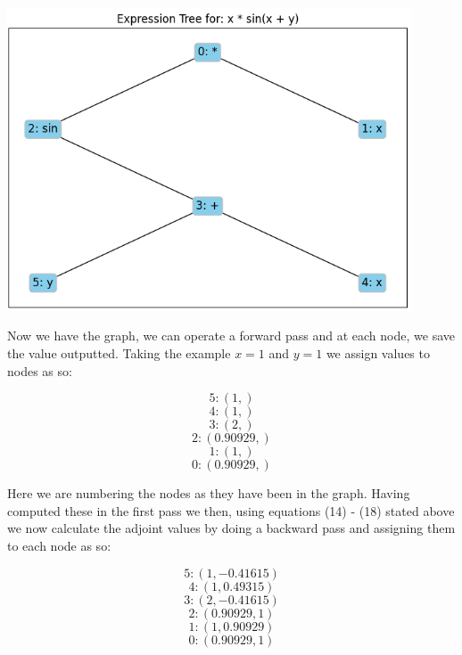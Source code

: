 \documentclass{article}
\begin{document}
\begin{center}
    \includegraphics[width=12cm]{images/DAG_1.png}
\end{center}

Now we have the graph, we can operate a forward pass and at each node, we save the value outputted. Taking the example $x = 1$ and $y = 1$ we assign values to nodes as so:

\begin{equation*}
    5: (1, ) 
\end{equation*}
\begin{equation*}
    4: (1, )
\end{equation*}
\begin{equation*}
    3: (2, )
\end{equation*}
\begin{equation*}
    2: (0.90929, )
\end{equation*}
\begin{equation*}
    1: (1, )
\end{equation*}
\begin{equation*}
    0: (0.90929, )
\end{equation*}

Here we are numbering the nodes as they have been in the graph. Having computed these in the first pass we then, using equations (14) - (18) stated above we now calculate the adjoint values by doing a backward pass and assigning them to each node as so:

\begin{equation*}
    5: (1, -0.41615)
\end{equation*}
\begin{equation*}
    4: (1, 0.49315)
\end{equation*}
\begin{equation*}
    3: (2, -0.41615)
\end{equation*}
\begin{equation*}
    2: (0.90929, 1)
\end{equation*}
\begin{equation*}
    1: (1, 0.90929)
\end{equation*}
\begin{equation*}
    0: (0.90929, 1)
\end{equation*}
\end{document}
